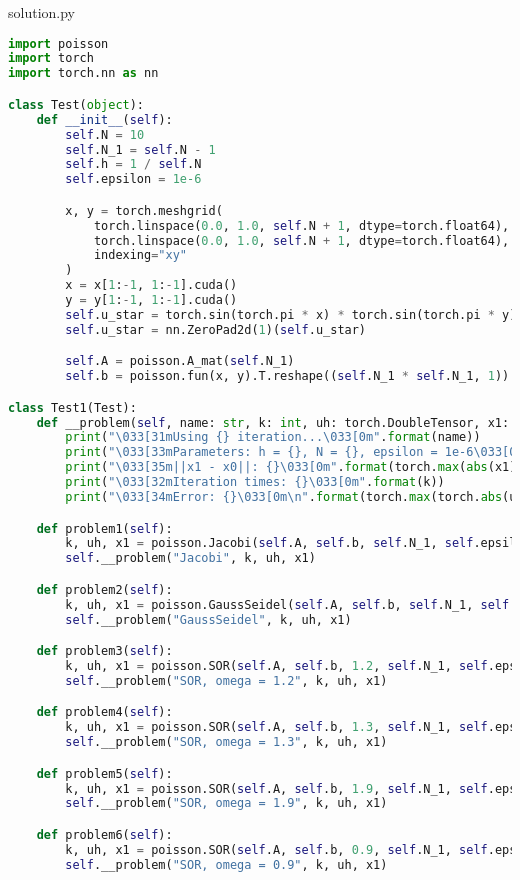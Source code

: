 \documentclass{article}
\begin{document}
solution.py
\begin{lstlisting}[language=Python]
import poisson
import torch
import torch.nn as nn

class Test(object):
    def __init__(self):
        self.N = 10
        self.N_1 = self.N - 1
        self.h = 1 / self.N
        self.epsilon = 1e-6

        x, y = torch.meshgrid(
            torch.linspace(0.0, 1.0, self.N + 1, dtype=torch.float64),
            torch.linspace(0.0, 1.0, self.N + 1, dtype=torch.float64),
            indexing="xy"
        )
        x = x[1:-1, 1:-1].cuda()
        y = y[1:-1, 1:-1].cuda()
        self.u_star = torch.sin(torch.pi * x) * torch.sin(torch.pi * y)
        self.u_star = nn.ZeroPad2d(1)(self.u_star)

        self.A = poisson.A_mat(self.N_1)
        self.b = poisson.fun(x, y).T.reshape((self.N_1 * self.N_1, 1)) * self.h ** 2

class Test1(Test):
    def __problem(self, name: str, k: int, uh: torch.DoubleTensor, x1: torch.DoubleTensor):
        print("\033[31mUsing {} iteration...\033[0m".format(name))
        print("\033[33mParameters: h = {}, N = {}, epsilon = 1e-6\033[0m".format(self.h, self.N))
        print("\033[35m||x1 - x0||: {}\033[0m".format(torch.max(abs(x1))))
        print("\033[32mIteration times: {}\033[0m".format(k))
        print("\033[34mError: {}\033[0m\n".format(torch.max(torch.abs(uh - self.u_star))))

    def problem1(self):
        k, uh, x1 = poisson.Jacobi(self.A, self.b, self.N_1, self.epsilon)
        self.__problem("Jacobi", k, uh, x1)

    def problem2(self):
        k, uh, x1 = poisson.GaussSeidel(self.A, self.b, self.N_1, self.epsilon)
        self.__problem("GaussSeidel", k, uh, x1)

    def problem3(self):
        k, uh, x1 = poisson.SOR(self.A, self.b, 1.2, self.N_1, self.epsilon)
        self.__problem("SOR, omega = 1.2", k, uh, x1)

    def problem4(self):
        k, uh, x1 = poisson.SOR(self.A, self.b, 1.3, self.N_1, self.epsilon)
        self.__problem("SOR, omega = 1.3", k, uh, x1)

    def problem5(self):
        k, uh, x1 = poisson.SOR(self.A, self.b, 1.9, self.N_1, self.epsilon)
        self.__problem("SOR, omega = 1.9", k, uh, x1)

    def problem6(self):
        k, uh, x1 = poisson.SOR(self.A, self.b, 0.9, self.N_1, self.epsilon)
        self.__problem("SOR, omega = 0.9", k, uh, x1)


\end{lstlisting}
\end{document}
